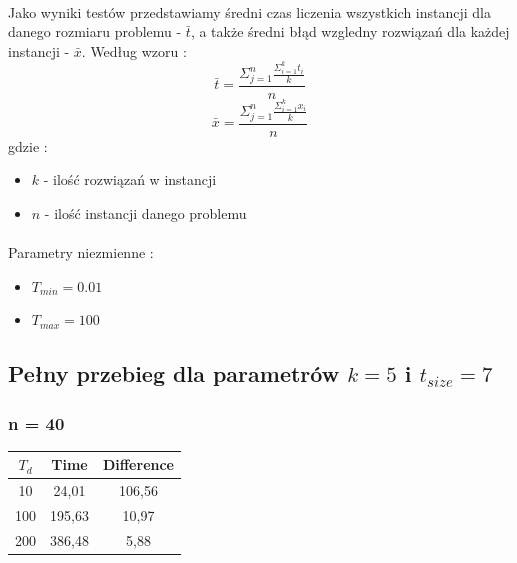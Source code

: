 \documentclass[wide,a4paper,titlepage,12pt] {article}
\begin{document}
\paragraph{}
Jako wyniki testów przedstawiamy średni czas liczenia wszystkich instancji dla danego rozmiaru problemu - $\bar{t}$, a także średni błąd wzgledny  rozwiązań dla każdej instancji - $\bar{x}$. Według wzoru : \\
\begin{equation}
    \bar{t} = \frac{\Sigma_{j=1}^{n}\frac{\Sigma_{i=1}^{k}t_{i}}{k}}{n}
\end{equation}
\begin{equation}
    \bar{x} = \frac{\Sigma_{j=1}^{n}\frac{\Sigma_{i=1}^{k}x_{i}}{k}}{n}
\end{equation}
gdzie : \\
\begin{itemize}
  \item $k$ - ilość rozwiązań w instancji
  \item $n$ - ilość instancji danego problemu
\end{itemize}
\paragraph{}
Parametry niezmienne : 
\begin{itemize}
  \item $T_{min} = 0.01$
  \item $T_{max} = 100$
\end{itemize}
\newpage
\subsection{Pełny przebieg dla parametrów $k=5$ i $t_{size} = 7$}
\subsubsection{n = 40}
\begin{center}
    \begin{tabular}{|c|c|c|}
      \hline
       $T_{d}$ & Time & Difference \\ \hline
        10  &24,01&   106,56\\ \hline
        100 &195,63 & 10,97\\ \hline
        200 &386,48 & 5,88\\ \hline
    \end{tabular}
\end{center}
\end{document}
